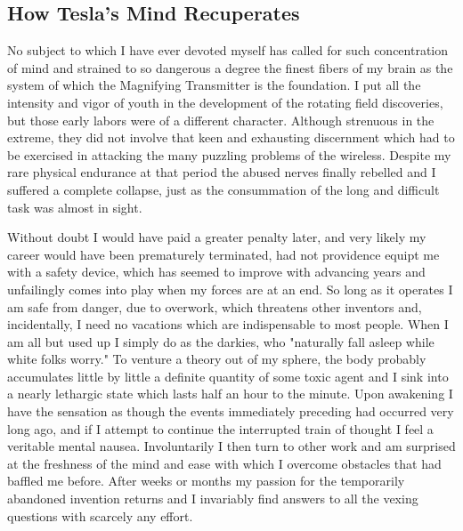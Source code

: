 \documentclass[a4paper,12pt,english,twoside,openright]{memoir}
\begin{document}

\subsection{How Tesla's Mind Recuperates}

No subject to which I have ever devoted myself has called for such concentration of mind and 
strained to so dangerous a degree the finest fibers of my brain as the system of which the 
Magnifying Transmitter is the foundation.  I put all the intensity and vigor of youth in the 
development of the rotating field discoveries, but those early labors were of a different character.  
Although strenuous in the extreme, they did not involve that keen and exhausting discernment 
which had to be exercised in attacking the many puzzling problems of the wireless.  Despite my 
rare physical endurance at that period the abused nerves finally rebelled and I suffered a 
complete collapse, just as the consummation of the long and difficult task was almost in sight.  

Without doubt I would have paid a greater penalty later, and very likely my career would have 
been prematurely terminated, had not providence equipt me with a safety device, which has 
seemed to improve with advancing years and unfailingly comes into play when my forces are at 
an end.  So long as it operates I am safe from danger, due to overwork, which threatens other 
inventors and, incidentally, I need no vacations which are indispensable to most people.  When I 
am all but used up I simply do as the darkies, who "naturally fall asleep while white folks worry." 
To venture a theory out of my sphere, the body probably accumulates little by little a definite 
quantity of some toxic agent and I sink into a nearly lethargic state which lasts half an hour to the 
minute.  Upon awakening I have the sensation as though the events immediately preceding had 
occurred very long ago, and if I attempt to continue the interrupted train of thought I feel a 
veritable mental nausea.  Involuntarily I then turn to other work and am surprised at the freshness 
of the mind and ease with which I overcome obstacles that had baffled me before.  After weeks or 
months my passion for the temporarily abandoned invention returns and I invariably find answers 
to all the vexing questions with scarcely any effort.  
\end{document}
